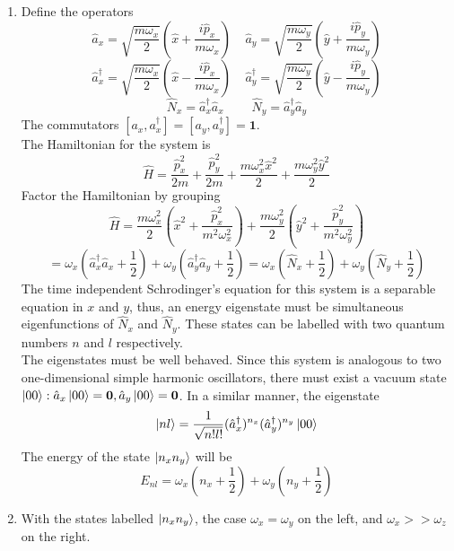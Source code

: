 \begin{sol}
\begin{enumerate}[label=\textbf{(\alph*)}]
\item
Define the operators
$$\hat a_x=\sqrt{\frac{m\omega_x}{2}}\left(\hat x+\frac{i\hat p_x}{m\omega_x}\right)\:\:\:\:\:\hat a_y=\sqrt{\frac{m\omega_y}{2}}\left(\hat y+\frac{i\hat p_y}{m\omega_y}\right)$$ 
$$\hat a_x^\dagger=\sqrt{\frac{m\omega_x}{2}}\left(\hat x-\frac{i\hat p_x}{m\omega_x}\right)\:\:\:\:\:\hat a_y^\dagger=\sqrt{\frac{m\omega_y}{2}}\left(\hat y-\frac{i\hat p_y}{m\omega_y}\right)$$ 
$$\hat N_x=\hat a_x^\dagger\hat a_x\:\:\:\:\:\:\:\:\:\:\hat N_y=\hat a_y^\dagger\hat a_y$$ 
The commutators $[a_x,a_x^\dagger]=[a_y,a_y^\dagger]=\mathbf 1$.\\
The Hamiltonian for the system is 
$$\hat H=\frac{\hat p_x^2}{2m}+\frac{\hat p_y^2}{2m}+\frac{m\omega_x^2\hat x^2}{2}+\frac{m\omega_y^2\hat y^2}{2}$$
Factor the Hamiltonian by grouping
$$\hat H=\frac{m\omega_x^2}{2}\left(\hat x^2+\frac{\hat p_x^2}{m^2\omega_x^2}\right)+\frac{m\omega_y^2}{2}\left(\hat y^2+\frac{\hat p_y^2}{m^2\omega_y^2}\right)$$
$$=\omega_x\left(\hat a_x^\dagger\hat a_x+\frac{1}{2}\right)+\omega_y\left(\hat a_y^\dagger\hat a_y+\frac{1}{2}\right)=\omega_x\left(\hat N_x+\frac{1}{2}\right)+\omega_y\left(\hat N_y+\frac{1}{2}\right)$$ 
The time independent Schrodinger's equation for this system is a separable equation in $x$ and $y$, thus, an energy eigenstate must be simultaneous eigenfunctions of $\hat N_x$ and $\hat N_y$. These states can be labelled with two quantum numbers $n$ and $l$ respectively. \\
The eigenstates must be well behaved. Since this system is analogous to two one-dimensional simple harmonic oscillators, there must exist a vacuum state $\ket{00}:\hat a_x\ket{00}=\mathbf 0,\hat a_y\ket{00}=\mathbf 0$. In a similar manner, the eigenstate $$\ket {nl}=\frac{1}{\sqrt{n!l!}}(\hat a_x^\dagger)^{n_x}(\hat a_y^\dagger)^{n_y}\ket{00}$$
The energy of the state $\ket{n_xn_y}$ will be 
$$E_{nl}=\omega_x\left(n_x+\frac{1}{2}\right)+\omega_y\left(n_y+\frac{1}{2}\right)$$
\item
With the states labelled $\ket{n_xn_y}$, the case $\omega_x=\omega_y$ on the left, and $\omega_x>>\omega_z$ on the right. 
\begin{center}
\end{center}
\end{enumerate}
\end{sol}
